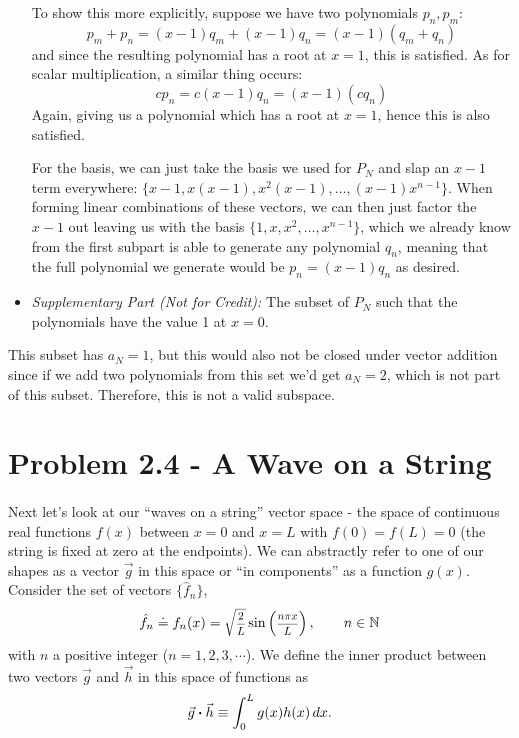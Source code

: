 \documentclass{article}
\begin{document}
\begin{itemize}
\begin{solution}
	  To show this more explicitly, suppose we have two polynomials $p_n, p_m$:
	  \[ p_m + p_n = (x - 1)q_m + (x-1) q_n = (x-1)(q_m + q_n)\]
	  and since the resulting polynomial has a root at $x = 1$, this is satisfied. As for scalar multiplication, 
	  a similar thing occurs: 
	  \[ c p_n = c(x - 1) q_n = (x-1)(cq_n)\] 
	  Again, giving us a polynomial which has a root at $x = 1$, hence this is also satisfied. 

	  For the basis, we can just take the basis we used for $P_N$ and slap an $x - 1$ term everywhere: $\{x - 1, x(x - 1), x^2(x - 1), \dots, (x -1)x^{n-1}\}$. When forming linear combinations of these vectors, we can then just
	  factor the $x - 1$ out leaving us with the basis $\{1, x, x^2, \dots, x^{n-1}\}$, which we already know from the first subpart is able to generate any polynomial $q_n$, meaning that the full polynomial we generate would be $p_n = (x - 1)q_n$ as desired. 
  \end{solution}
		\item \emph{Supplementary Part (Not for Credit):} The subset of $P_{N}$ such that the polynomials have the value 1 at $x=0$.
	\end{itemize}

	\begin{solution}
		This subset has $a_N = 1$, but this would also not be closed under vector addition since if we add two 
		polynomials from this set we'd get $a_N = 2$, which is not part of this subset. Therefore, this is 
		not a valid subspace.
	\end{solution}

\bigskip
\pagebreak
\bigskip
\section*{Problem 2.4 - A Wave on a String}

\paragraph{}
Next let's look at our ``waves on a string'' vector space - the space of continuous real functions $f(x)$ between $x=0$ and $x=L$ with $f(0) = f(L) = 0$ (the string is fixed at zero
at the endpoints).  We can abstractly refer to one of our shapes as a vector $\vec{g}$ in this space or ``in components'' as a function $g(x)$.  Consider the set of vectors
$\{\hat{f}_{n}\}$,
	\begin{equation*}
		\hat{f}_{n} \doteq f_{n}(x) = \sqrtfsm{2}{L}\sin\left(\fracsm{n\pi x}{L}\right),	\qquad n \in \mathbb{N}
	\end{equation*}
with $n$ a positive integer ($n=1,2,3,\cdots$).
We define the inner product between two vectors $\vec{g}$ and $\vec{h}$ in this space of functions as
	\begin{equation}
		\vec{g}\boldsymbol{\cdot}\vec{h} \equiv \int_{0}^{L} g(x)h(x)\,dx.
	\label{stringscalar}
	\end{equation}
\end{document}
